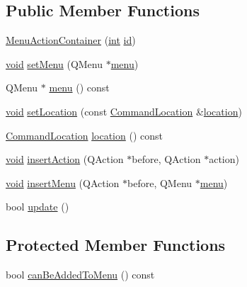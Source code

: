 \subsection*{Public Member Functions}
\begin{DoxyCompactItemize}
\item 
\hyperlink{group___core_plugin_gaae5e916660a2963852273a4bb2c2b2f5}{Menu\-Action\-Container} (\hyperlink{ioapi_8h_a787fa3cf048117ba7123753c1e74fcd6}{int} \hyperlink{glext_8h_a58c2a664503e14ffb8f21012aabff3e9}{id})
\item 
\hyperlink{group___u_a_v_objects_plugin_ga444cf2ff3f0ecbe028adce838d373f5c}{void} \hyperlink{group___core_plugin_ga2e4053ff02b8701c2909c2e330dd4e27}{set\-Menu} (Q\-Menu $\ast$\hyperlink{group___core_plugin_gad2fa92d740f205ff2f12edad0b8fee36}{menu})
\item 
Q\-Menu $\ast$ \hyperlink{group___core_plugin_gad2fa92d740f205ff2f12edad0b8fee36}{menu} () const 
\item 
\hyperlink{group___u_a_v_objects_plugin_ga444cf2ff3f0ecbe028adce838d373f5c}{void} \hyperlink{group___core_plugin_gabbdf7e17f4d50838e08ba7f58cf59195}{set\-Location} (const \hyperlink{struct_command_location}{Command\-Location} \&\hyperlink{glext_8h_a6f0165ed903f22b8bb600c3e0b628e73}{location})
\item 
\hyperlink{struct_command_location}{Command\-Location} \hyperlink{group___core_plugin_gae6c846d7bfe9fa778dd7d18bcbd69daf}{location} () const 
\item 
\hyperlink{group___u_a_v_objects_plugin_ga444cf2ff3f0ecbe028adce838d373f5c}{void} \hyperlink{group___core_plugin_ga8c9db6d7e64a4d62fab4346ac6f6dc8f}{insert\-Action} (Q\-Action $\ast$before, Q\-Action $\ast$action)
\item 
\hyperlink{group___u_a_v_objects_plugin_ga444cf2ff3f0ecbe028adce838d373f5c}{void} \hyperlink{group___core_plugin_ga589b7bfea67988b5a87dc94f93a905bf}{insert\-Menu} (Q\-Action $\ast$before, Q\-Menu $\ast$\hyperlink{group___core_plugin_gad2fa92d740f205ff2f12edad0b8fee36}{menu})
\item 
bool \hyperlink{group___core_plugin_gae05123001e64d02f278628c645b6b513}{update} ()
\end{DoxyCompactItemize}
\subsection*{Protected Member Functions}
\begin{DoxyCompactItemize}
\item 
bool \hyperlink{group___core_plugin_ga9bc589dfd5d7dea6836a3b9a628fe43a}{can\-Be\-Added\-To\-Menu} () const 
\end{DoxyCompactItemize}
